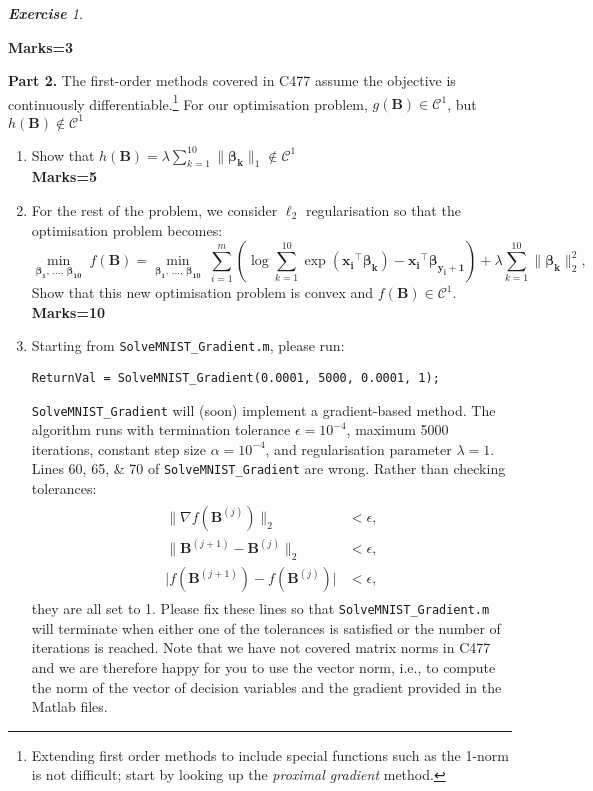 \documentclass[12pt]{article}
\numberwithin{equation}{section}
\theoremstyle{remark}
\newtheorem{exercise}{\bf Exercise}
\newcommand{\vect}[1]{\boldsymbol{#1}}
\newcommand{\norm}[2]{\|#1\|_{#2}}
\begin{document}
\begin{exercise}
\begin{enumerate}
\phantom{hi} \hfill {\bf Marks=3} 
%
\end{enumerate}
%
{\bf Part 2.} The first-order methods covered in C477 assume the objective is continuously differentiable.\footnote{Extending first order methods to include special functions such as the 1-norm is not difficult; start by looking up the \emph{proximal gradient} method.} For our optimisation problem, $g(\vect{B}) \in \mathcal{C}^1$, but $h(\vect{B}) \notin \mathcal{C}^1$ 
%
\begin{enumerate}
%
\item Show that $h(\vect{B}) = \lambda \sum\limits_{k = 1}^{10} \norm{\vect{\beta_k}}{1} \notin \mathcal{C}^1$ \\
\phantom{hi} \hfill {\bf Marks=5}
%
\item For the rest of the problem, we consider $\ell_2$ regularisation so that the optimisation problem becomes:
%
\[
\min\limits_{\vect{\beta_1}, \, \ldots, \, \vect{\beta_{10}}} \; f(\vect{B}) = \min\limits_{\vect{\beta_1}, \, \ldots, \, \vect{\beta_{10}}} \; \sum\limits_{i = 1}^m \left( \log \sum\limits_{k = 1}^{10} \exp \left( \vect{x_i}^{\top} \vect{\beta_k} \right) - \vect{x_i}^{\top} \vect{\beta_{y_i + 1}} \right) + \lambda \sum\limits_{k = 1}^{10} \norm{\vect{\beta_k}}{2}^2,
\]
%
Show that this new optimisation problem is convex and $f(\vect{B}) \in \mathcal{C}^1$. \\
\phantom{hi} \hfill {\bf Marks=10}
% 
\item Starting from \texttt{SolveMNIST\_Gradient.m}, please run:
\begin{center}
\texttt{ReturnVal = SolveMNIST\_Gradient(0.0001, 5000, 0.0001, 1);}
\end{center}
%
\texttt{SolveMNIST\_Gradient} will (soon) implement a gradient-based method. The algorithm runs with termination tolerance $\epsilon = 10^{-4}$, maximum 5000 iterations, constant step size $\alpha = 10^{-4}$, and regularisation parameter $\lambda = 1$.
%
Lines 60, 65, \& 70 of \texttt{SolveMNIST\_Gradient} are wrong. Rather than checking tolerances: 
%
\begin{align*}
\begin{array}{ll}
\norm{\nabla f(\vect{B}^{(j)})}{2} &< \epsilon, \\[2pt]
\norm{ \vect{B}^{(j + 1)} - \vect{B}^{(j)} }{2} &< \epsilon, \\[2pt]
\lvert f(\vect{B}^{(j + 1)}) - f(\vect{B}^{(j)}) \rvert &< \epsilon, 
\end{array}
\end{align*}
%
they are all set to 1. Please fix these lines so that \texttt{SolveMNIST\_Gradient.m} will terminate when either one of the tolerances is satisfied or the number of iterations is reached. Note that we have not covered matrix norms in C477 and we are therefore happy for you to use the vector norm, i.e., to compute the norm of the vector of decision variables and the gradient provided in the Matlab files.

\end{enumerate}
\end{exercise}
\end{document}

